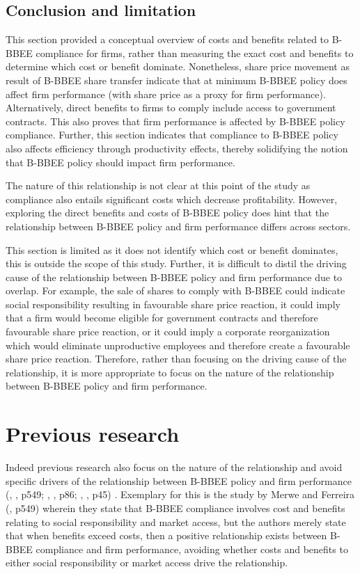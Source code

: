 \subsection{Conclusion and limitation}
This section provided a conceptual overview of costs and benefits related to B-BBEE compliance for firms, rather than measuring the exact cost and benefits to determine which cost or benefit dominate. Nonetheless, share price movement as result of B-BBEE share transfer indicate that at minimum B-BBEE policy does affect firm performance (with share price as a proxy for firm performance). Alternatively, direct benefits to firms to comply include access to government contracts. This also proves that firm performance is affected by B-BBEE policy compliance. Further, this section indicates that compliance to B-BBEE policy also affects efficiency through productivity effects, thereby solidifying the notion that B-BBEE policy should impact firm performance.

The nature of this relationship is not clear at this point of the study as compliance also entails significant costs which decrease profitability. However, exploring the direct benefits and costs of B-BBEE policy does hint that the relationship between B-BBEE policy and firm performance differs across sectors.

This section is limited as it does not identify which cost or benefit dominates, this is outside the scope of this study. Further, it is difficult to distil the driving cause of the relationship between B-BBEE policy and firm performance due to overlap. For example, the sale of shares to comply with B-BBEE could indicate social responsibility resulting in favourable share price reaction, it could imply that a firm would become eligible for government contracts and therefore favourable share price reaction, or it could imply a corporate reorganization which would eliminate unproductive employees and therefore create a favourable share price reaction. Therefore, rather than focusing on the driving cause of the relationship, it is more appropriate to focus on the nature of the relationship between B-BBEE policy and firm performance.
\section{Previous research}
Indeed previous research also focus on the nature of the relationship and avoid specific drivers of the relationship between B-BBEE policy and firm performance (\citeauthor{N7}, \citeyear{N7}, p549; \citeauthor{N27}, \citeyear{N27}, p86; \citeauthor{N4}, \citeyear{N4}, p45) . Exemplary for this is the study by Merwe and Ferreira (\citeyear{N7}, p549) wherein they state that B-BBEE compliance involves cost and benefits relating to social responsibility and market access, but the authors merely state that when benefits exceed costs, then a positive relationship exists between B-BBEE compliance and firm performance, avoiding whether costs and benefits to either social responsibility or market access drive the relationship.

